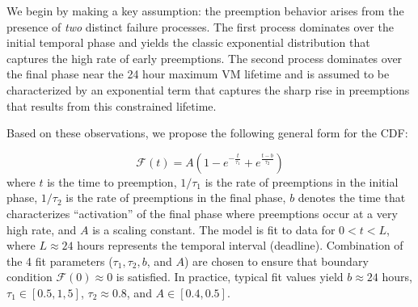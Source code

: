 We begin by making a key assumption: the preemption behavior arises from the presence of \emph{two} distinct failure processes.
The first process dominates over the initial temporal phase and yields the classic exponential distribution that captures the high rate of early preemptions.
The second process dominates over the final phase near the 24 hour maximum VM lifetime and is assumed to be characterized by an exponential term that captures the sharp rise in preemptions that results from this constrained lifetime. 

%
%

Based on these observations, we propose the following general form for the CDF:

\vspace*{\subsecspace}
\begin{equation}
  \label{eq:blend1}
  \boxed{
  \mathscr{F}\left(t\right) = A\left(1-e^{-\frac{t}{\tau_1}} + e^{\frac{t-b}{\tau_2}}\right)}
  \end{equation}
\noindent where $t$ is the time to preemption, $1/\tau_1$ is the rate of preemptions in the initial phase, $1/\tau_2$ is the rate of preemptions in the final phase, $b$ denotes the time that characterizes ``activation'' of the final phase where preemptions occur at a very high rate, and $A$ is a scaling constant. 
%
The model is fit to data for $0 < t < L$, where $L \approx 24$ hours represents the temporal interval (deadline).
Combination of the 4 fit parameters ($\tau_1, \tau_2, b$, and $A$) are chosen to ensure that boundary condition $\mathscr{F}(0) \approx 0$ is satisfied.
In practice, typical fit values yield $b \approx 24$ hours, $\tau_1 \in [0.5, 1,5] $, $\tau_2 \approx 0.8$, and $A \in [0.4, 0.5]$.



